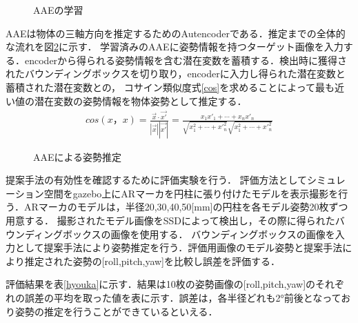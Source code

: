 \documentclass{jsarticle}
\begin{document}
\begin{figure}[ht]
\vspace{-5zh}
\setlength{\epsfxsize}{7.5cm}
\centerline{}
\vspace{5zh}
\caption{AAEの学習}
\label{BB}
\vspace{-1.0zh}
\end{figure}




AAEは物体の三軸方向を推定するためのAutencoderである．推定までの全体的な流れを図\ref{GG}に示す．
学習済みのAAEに姿勢情報を持つターゲット画像を入力する．encoderから得られる姿勢情報を含む潜在変数を蓄積する．検出時に獲得されたバウンディングボックスを切り取り，encoderに入力し得られた潜在変数と蓄積された潜在変数との，
コサイン類似度式\ref{cos}を求めることによって最も近い値の潜在変数の姿勢情報を物体姿勢として推定する．
\footnotesize{
\begin{eqnarray}
\label{cos}
cos(x，x)=\frac{\vec{x}\cdot\vec{x'}}{|\vec{x}||\vec{x'}|}
=\frac{x_1x'_1+\cdots+x_n x'_n}{\sqrt{x^2_1+\cdots+x'^2_n}\sqrt{x^2_1+\cdots+x'^2_n}}
\end{eqnarray}
}

\begin{figure}[ht]
\vspace{-5zh}
\setlength{\epsfxsize}{7.5cm}
\centerline{}
\vspace{5zh}
\caption{AAEによる姿勢推定}
\label{GG}
\vspace{-1.0zh}
\end{figure}





提案手法の有効性を確認するために評価実験を行う．
評価方法としてシミュレーション空間をgazebo上にARマーカを円柱に張り付けたモデルを表示撮影を行う．ARマーカのモデルは，半径20,30,40,50[mm]の円柱を各モデル姿勢20枚ずつ用意する．
撮影されたモデル画像をSSDによって検出し，その際に得られたバウンディングボックスの画像を使用する．
バウンディングボックスの画像を入力として提案手法により姿勢推定を行う．評価用画像のモデル姿勢と提案手法により推定された姿勢の[roll,pitch,yaw]を比較し誤差を評価する．

評価結果を表\ref{hyouka}に示す．結果は10枚の姿勢画像の[roll,pitch,yaw]のそれぞれの誤差の平均を取った値を表に示す．誤差は，各半径どれも2°前後となっており姿勢の推定を行うことができているといえる．
\end{document}
